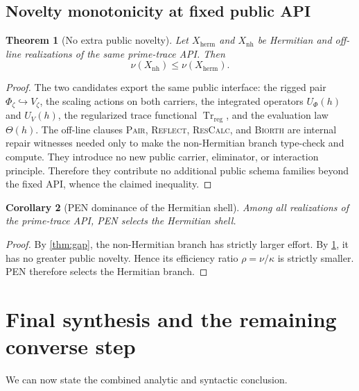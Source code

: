 \documentclass[11pt,a4paper]{article}
\theoremstyle{plain}
\newtheorem{theorem}{Theorem}[section]
\newtheorem{corollary}[theorem]{Corollary}
\theoremstyle{definition}
\newcommand{\Trreg}{\operatorname{Tr}_{\mathrm{reg}}}
\newcommand{\effort}{\kappa}
\newcommand{\novelty}{\nu}
\newcommand{\efficiency}{\rho}
\newcommand{\herm}{\mathrm{herm}}
\newcommand{\nonherm}{\mathrm{nh}}
\begin{document}
\subsection{Novelty monotonicity at fixed public API}

\begin{theorem}[No extra public novelty]
\label{thm:nonew-nu}
Let $X_{\herm}$ and $X_{\nonherm}$ be Hermitian and off-line realizations of the same prime-trace API. Then
\[
  \novelty(X_{\nonherm})\le \novelty(X_{\herm}).
\]
\end{theorem}

\begin{proof}
The two candidates export the same public interface: the rigged pair $\Phi_{\zeta}\hookrightarrow V_{\zeta}$, the scaling actions on both carriers, the integrated operators $U_{\Phi}(h)$ and $U_V(h)$, the regularized trace functional $\Trreg$, and the evaluation law $\Theta(h)$. The off-line clauses \textsc{Pair}, \textsc{Reflect}, \textsc{ResCalc}, and \textsc{Biorth} are internal repair witnesses needed only to make the non-Hermitian branch type-check and compute. They introduce no new public carrier, eliminator, or interaction principle. Therefore they contribute no additional public schema families beyond the fixed API, whence the claimed inequality.
\end{proof}

\begin{corollary}[PEN dominance of the Hermitian shell]
\label{cor:pendom}
Among all realizations of the prime-trace API, PEN selects the Hermitian shell.
\end{corollary}

\begin{proof}
By \cref{thm:gap}, the non-Hermitian branch has strictly larger effort. By \cref{thm:nonew-nu}, it has no greater public novelty. Hence its efficiency ratio $\efficiency=\novelty/\effort$ is strictly smaller. PEN therefore selects the Hermitian branch.
\end{proof}

\section{Final synthesis and the remaining converse step}
\label{sec:rh}

We can now state the combined analytic and syntactic conclusion.
\end{document}
